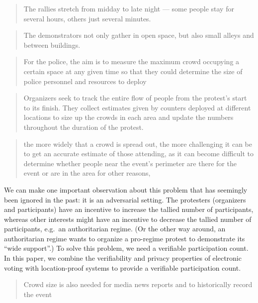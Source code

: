\blockcquote{2016DemonstrationsInSeoul}{%
  The rallies stretch from midday to late night --- some people stay for 
  several hours, others just several minutes.%
}

\blockcquote{2016DemonstrationsInSeoul}{%
  The demonstrators not only gather in open space, but also small alleys and 
  between buildings.%
}

\blockcquote{2016DemonstrationsInSeoul}{%
  For the police, the aim is to measure the maximum crowd occupying a certain 
  space at any given time so that they could determine the size of police 
  personnel and resources to deploy%
}

\blockcquote{2016DemonstrationsInSeoul}{%
  Organizers seek to track the entire flow of people from the protest’s start 
  to its finish. They collect estimates given by counters deployed at different 
  locations to size up the crowds in each area and update the numbers 
  throughout the duration of the protest.%
}

\blockcquote{HowToEstimateCrowdSize}{%
  the more widely that a crowd is spread out, the more challenging it can be to 
  get an accurate estimate of those attending, as it can become difficult to 
  determine whether people near the event's perimeter are there for the event 
  or are in the area for other reasons,%
}


We can make one important observation about this problem that has seemingly 
been ignored in the past: it is an adversarial setting.
The protesters (organizers and participants) have an incentive to increase the 
tallied number of participants, whereas other interests might have an incentive 
to decrease the tallied number of participants, e.g.\ an authoritarian regime.
(Or the other way around, an authoritarian regime wants to organize a 
pro-regime protest to demonstrate its \enquote{wide support}.)
To solve this problem, we need a verifiable participation count.
In this paper, we combine the verifiability and privacy properties of 
electronic voting with location-proof systems to provide a verifiable 
participation count.


\blockcquote{HowToEstimateCrowdSize}{%
  Crowd size is also needed for media news reports and to historically record 
  the event%
}


